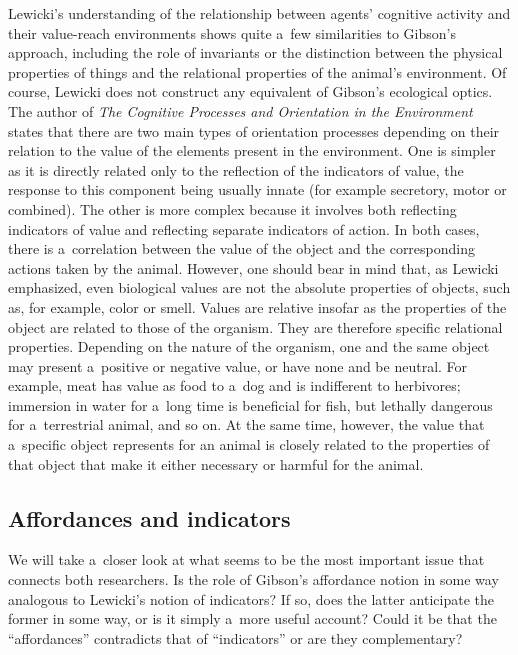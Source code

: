 \documentclass[%
manuscript=article,
year=2024,
volume=77,
doi=10.59203/zfn.77.693,
]{zfn}
\begin{document}
Lewicki's understanding of the relationship between agents' cognitive activity and their value-reach environments shows quite a~few similarities to Gibson's approach, including the role of invariants or the distinction between the physical properties of things and the relational properties of the animal's environment. Of course, Lewicki does not construct any equivalent of Gibson's ecological optics. The author of \textit{The Cognitive Processes and Orientation in the Environment} states that there are two main types of orientation processes depending on their relation to the value of the elements present in the environment. One is simpler as it is directly related only to the reflection of the indicators of value, the response to this component being usually innate (for example secretory, motor or combined). The other is more complex because it involves both reflecting indicators of value and reflecting separate indicators of action. In both cases, there is a~correlation between the value of the object and the corresponding actions taken by the animal. However, one should bear in mind that, as Lewicki emphasized, even biological values are not the absolute properties of objects, such as, for example, color or smell. Values are relative insofar as the properties of the object are related to those of the organism. They are therefore specific relational properties. Depending on the nature of the organism, one and the same object may present a~positive or negative value, or have none and be neutral. For example, meat has value as food to a~dog and is indifferent to herbivores; immersion in water for a~long time is beneficial for fish, but lethally dangerous for a~terrestrial animal, and so on. At the same time, however, the value that a~specific object represents for an animal is closely related to the properties of that object that make it either necessary or harmful for the animal.



\subsection{Affordances and indicators}



We will take a~closer look at what seems to be the most important issue that connects both researchers. Is the role of Gibson's affordance notion in some way analogous to Lewicki's notion of indicators? If so, does the latter anticipate the former in some way, or is it simply a~more useful account? Could it be that the ``affordances'' contradicts that of ``indicators'' or are they complementary?
\end{document}

